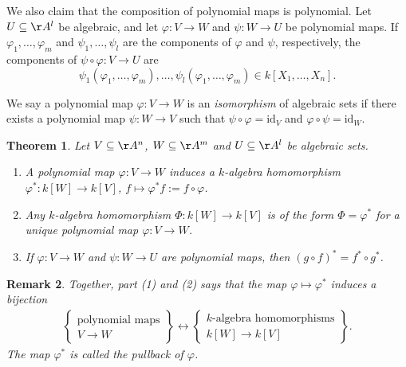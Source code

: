 \documentclass[12pt]{amsart}
\theoremstyle{plain}
\newtheorem{theorem}{Theorem}%
\newtheorem{remark}[theorem]{Remark}
\begin{document}
We also claim that the composition of polynomial maps is polynomial.
Let $U \subseteq \AA^l$ be algebraic, and let $\varphi: V \to W$ and $\psi : W \to U$ be polynomial maps.
If $\varphi_1, \ldots, \varphi_m$ and $\psi_1, \ldots, \psi_l$ are the components of $\varphi$ and $\psi$, respectively, the components of $\psi \circ \varphi : V \to U$ are
$$\psi_1(\varphi_1, \ldots, \varphi_m), \ldots, \psi_l(\varphi_1, \ldots, \varphi_m) \in k[X_1, \ldots, X_n].$$

We say a polynomial map $\varphi : V \to W$ is an \emph{isomorphism} of algebraic sets if there exists a polynomial map $\psi: W \to V$ such that $\psi \circ \varphi = \mathrm{id}_V$ and $\varphi \circ \psi = \mathrm{id}_W$.

\begin{theorem}
Let $V \subseteq \AA^n$, $W \subseteq \AA^m$ and $U \subseteq \AA^l$ be algebraic sets.
\begin{enumerate}
\item
A polynomial map $\varphi:V \to W$ induces a $k$-algebra homomorphism $\varphi^*:k[W] \to k[V]$, $f \mapsto \varphi^*f := f \circ \varphi$.

\item
Any $k$-algebra homomorphism $\Phi:k[W] \to k[V]$ is of the form $\Phi = \varphi^*$ for a unique polynomial map $\varphi : V \to W$.

\item 
If $\varphi : V \to W$ and $\psi : W \to U$ are polynomial maps, then $(g \circ f)^* = f^* \circ g^*$.
\end{enumerate}
\end{theorem}
\begin{remark}
Together, part (1) and (2) says that the map $\varphi \mapsto \varphi^*$ induces a bijection
\begin{align*}\label{ringidealbijection}
\left\{
\begin{array}{c}
	\text{polynomial maps} \\
	V \to W
\end{array}
\right\} \longleftrightarrow 
\left\{
\begin{array}{c}
	k\text{-algebra homomorphisms} \\
	k[W] \to k[V]
\end{array}
\right\}.
\end{align*}
The map $\varphi^*$ is called the pullback of $\varphi$.
\end{remark}
\end{document}
